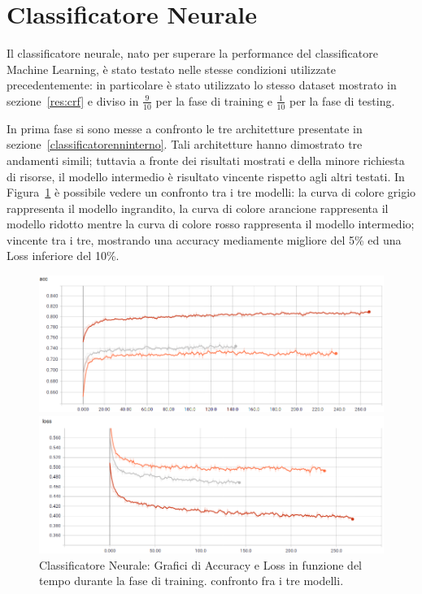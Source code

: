 \newpage
\section{Classificatore Neurale}
\label{ris:cnn}
Il classificatore neurale, nato per superare la performance del classificatore Machine Learning, è stato testato nelle stesse condizioni utilizzate precedentemente: in particolare è stato utilizzato lo stesso dataset mostrato in sezione~\ref{res:crf} e diviso in $\frac{9}{10}$ per la fase di training e $\frac{1}{10}$ per la fase di testing.

In prima fase si sono messe a confronto le tre architetture presentate in sezione~\ref{classificatorenninterno}. Tali architetture hanno dimostrato tre andamenti simili; tuttavia a fronte dei risultati mostrati e della minore richiesta di risorse, il modello intermedio è risultato vincente rispetto agli altri testati. In Figura~\ref{fig:cfrmlp} è possibile vedere un confronto tra i tre modelli: la curva di colore grigio rappresenta il modello ingrandito, la curva di colore arancione rappresenta il modello ridotto mentre la curva di colore rosso rappresenta il modello intermedio; vincente tra i tre, mostrando una accuracy mediamente migliore del 5\% ed una Loss inferiore del 10\%. 

\begin{figure}[!bp] 
\centering
	\begin{minipage}[t]{\linewidth}
		\includegraphics[width=\linewidth]{figures/MLP1.png}
	\end{minipage}\hfill
	\vspace{3cm}
	\begin{minipage}[b]{\linewidth}
		\includegraphics[width=\linewidth]{figures/MLP2.png}
	\end{minipage}
	\caption{Classificatore Neurale: Grafici di Accuracy e Loss in funzione del tempo durante la fase di training. confronto fra i tre modelli. \label{fig:cfrmlp}}
\end{figure}

